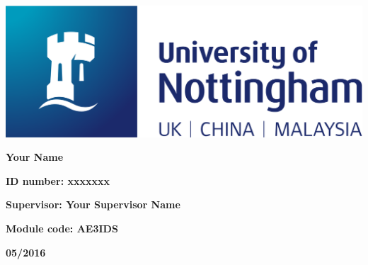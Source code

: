 \documentclass[a4paper]{article}
\begin{document}
  
  \vskip 1.5in \par 
  \begin{center}
    \includegraphics[width=0.8\columnwidth]{nottingham-logo.png} \par

    \vskip 1.5in \par 
    \Huge {\bf Your Name}
  \end{center}
  

  \vskip 1in \par
  \huge {\bf ID number: xxxxxxx}
  \vskip 0.5in \par
  \huge {\bf Supervisor: Your Supervisor Name}
  \vskip 0.5in \par
  \huge {\bf Module code: AE3IDS}
  \vskip 1in \par
  \centering \huge {\bf 05/2016}
\end{document}
